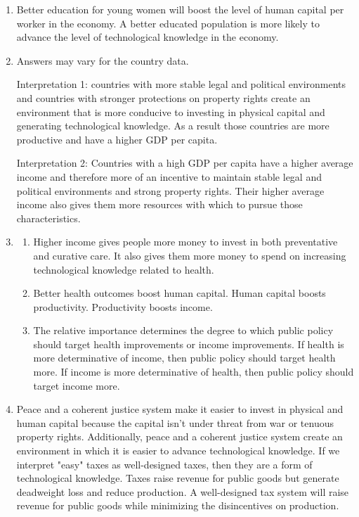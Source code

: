 \documentclass{article}
\begin{document}
\begin{enumerate}
\item Better education for young women will boost the level of human capital per worker in the economy. A better educated population is more likely to advance the level of technological knowledge in the economy.

\item Answers may vary for the country data. 

Interpretation 1: countries with more stable legal and political environments and countries with stronger protections on property rights create an environment that is more conducive to investing in physical capital and generating technological knowledge. As a result those countries are more productive and have a higher GDP per capita.

Interpretation 2: Countries with a high GDP per capita have a higher average income and therefore more of an incentive to maintain stable legal and political environments and strong property rights. Their higher average income also gives them more resources with which to pursue those characteristics.

\item

	\begin{enumerate}
	
	\item Higher income gives people more money to invest in both preventative and curative care. It also gives them more money to spend on increasing technological knowledge related to health.
	
	\item Better health outcomes boost human capital. Human capital boosts productivity. Productivity boosts income. 
	
	\item The relative importance determines the degree to which public policy should target health improvements or income improvements. If health is more determinative of income, then public policy should target health more. If income is more determinative of health, then public policy should target income more.
	
	\end{enumerate}
	
\item Peace and a coherent justice system make it easier to invest in physical and human capital because the capital isn't under threat from war or tenuous property rights. Additionally, peace and a coherent justice system create an environment in which it is easier to advance technological knowledge. If we interpret "easy" taxes as well-designed taxes, then they are a form of technological knowledge. Taxes raise revenue for public goods but generate deadweight loss and reduce production. A well-designed tax system will raise revenue for public goods while minimizing the disincentives on production.

\end{enumerate}
\end{document}
